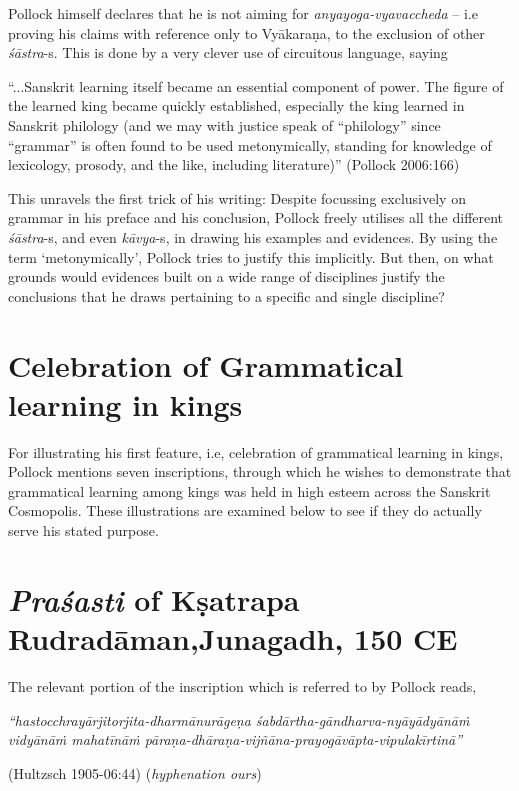 Pollock himself declares that he is not aiming for {\sl anyayoga-vyavaccheda} -- i.e proving his claims with reference only to Vyākaraṇa, to the exclusion of other {\sl śāstra}-s. This is done by a very clever use of circuitous language, saying 
\begin{myquote}
``...Sanskrit learning itself became an essential component of power. The figure of the learned king became quickly established, especially the king learned in Sanskrit philology (and we may with justice speak of ``philology'' since ``grammar'' is often found to be used metonymically, standing for knowledge of lexicology, prosody, and the like, including literature)''
\hfill (Pollock 2006:166)
\end{myquote}

This unravels the first trick of his writing: Despite focussing exclusively on grammar in his preface and his conclusion, Pollock freely utilises all the different {\sl śāstra}-s, and even {\sl kāvya}-s, in drawing his examples and evidences. By using the term `metonymically', Pollock tries to justify this implicitly. But then, on what grounds would evidences built on a wide range of disciplines justify the conclusions that he draws pertaining to a specific and single discipline?

\section*{Celebration of Grammatical learning in kings}

For illustrating his first feature, i.e, celebration of grammatical learning in kings, Pollock mentions seven inscriptions, through which he wishes to demonstrate that grammatical learning among kings was held in high esteem across the Sanskrit Cosmopolis. These illustrations are examined below to see if they do actually serve his stated purpose. 

\section{{\sl\bfseries Praśasti} of Kṣatrapa Rudradāman,\newline Junagadh, 150 CE}\label{chap3-sec1}

The relevant portion of the inscription which is referred to by Pollock reads,
\begin{myquote}
{{\sl ``hastocchrayārjitorjita-dharmānurāgeṇa śabdārtha-gāndharva-nyāyādyānāṁ vidyānāṁ mahatīnāṁ pāraṇa-dhāraṇa-vijñāna-prayogāvāpta-vipulakīrtinā''}}

\hfill (Hultzsch 1905-06:44) ({\sl hyphenation ours})
\end{myquote}

